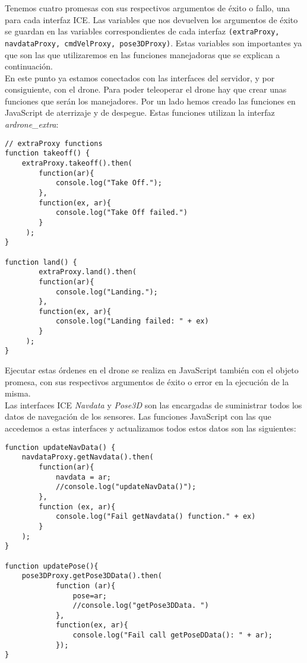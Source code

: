 Tenemos cuatro promesas con sus respectivos argumentos de éxito o fallo, una para cada interfaz ICE. Las variables que nos devuelven los argumentos de éxito se guardan en las variables correspondientes de cada interfaz \texttt{(extraProxy, navdataProxy, cmdVelProxy, pose3DProxy)}. Estas variables son importantes ya que son las que utilizaremos en las funciones manejadoras que se explican a continuación.\\

En este punto ya estamos conectados con las interfaces del servidor, y por consiguiente, con el drone. Para poder teleoperar el drone hay que crear unas funciones que serán los manejadores. Por un lado hemos creado las funciones en JavaScript de aterrizaje y de despegue. Estas funciones utilizan la interfaz \emph{ardrone\_extra}:\\

\begin{lstlisting}[caption=Funciones aterrizaje y despegue.]
// extraProxy functions  
function takeoff() {
    extraProxy.takeoff().then(
        function(ar){
            console.log("Take Off.");
        },
        function(ex, ar){
            console.log("Take Off failed.")
        }
     );
}
    
function land() {
        extraProxy.land().then(
        function(ar){
            console.log("Landing.");
        },
        function(ex, ar){
            console.log("Landing failed: " + ex)
        }
     );
}
\end{lstlisting}

Ejecutar estas órdenes en el drone se realiza en JavaScript también con el objeto promesa, con sus respectivos argumentos de éxito o error en la ejecución de la misma.\\

Las interfaces ICE \emph{Navdata} y \emph{Pose3D} son las encargadas de suministrar todos los datos de navegación de los sensores. Las funciones JavaScript con las que accedemos a estas interfaces y actualizamos todos estos datos son las siguientes:

\begin{lstlisting}[caption=Variables actualización datos de los sensores.]
function updateNavData() {
    navdataProxy.getNavdata().then(
        function(ar){
            navdata = ar;
            //console.log("updateNavData()");
        },
        function (ex, ar){
            console.log("Fail getNavdata() function." + ex)
        }        
    );    
}

function updatePose(){
    pose3DProxy.getPose3DData().then(
            function (ar){
                pose=ar;
                //console.log("getPose3DData. ")
            },
            function(ex, ar){
                console.log("Fail call getPoseDData(): " + ar);
            });   
}
\end{lstlisting}


